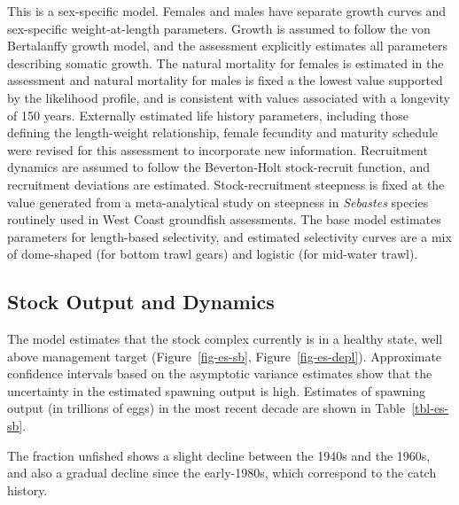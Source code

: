\documentclass[
]{scrartcl}
\begin{document}
This is a sex-specific model. Females and males have separate growth
curves and sex-specific weight-at-length parameters. Growth is assumed
to follow the von Bertalanffy growth model, and the assessment
explicitly estimates all parameters describing somatic growth. The
natural mortality for females is estimated in the assessment and natural
mortality for males is fixed a the lowest value supported by the
likelihood profile, and is consistent with values associated with a
longevity of 150 years. Externally estimated life history parameters,
including those defining the length-weight relationship, female
fecundity and maturity schedule were revised for this assessment to
incorporate new information. Recruitment dynamics are assumed to follow
the Beverton-Holt stock-recruit function, and recruitment deviations are
estimated. Stock-recruitment steepness is fixed at the value generated
from a meta-analytical study on steepness in \emph{Sebastes} species
routinely used in West Coast groundfish assessments. The base model
estimates parameters for length-based selectivity, and estimated
selectivity curves are a mix of dome-shaped (for bottom trawl gears) and
logistic (for mid-water trawl).

\subsection*{Stock Output and Dynamics}\label{stock-output-and-dynamics}

The model estimates that the stock complex currently is in a healthy
state, well above management target (Figure~\ref{fig-es-sb},
Figure~\ref{fig-es-depl}). Approximate confidence intervals based on the
asymptotic variance estimates show that the uncertainty in the estimated
spawning output is high. Estimates of spawning output (in trillions of
eggs) in the most recent decade are shown in Table~\ref{tbl-es-sb}.

The fraction unfished shows a slight decline between the 1940s and the
1960s, and also a gradual decline since the early-1980s, which
correspond to the catch history.

\newpage

\begingroup
\fontsize{9.0pt}{10.8pt}\selectfont
\end{document}
